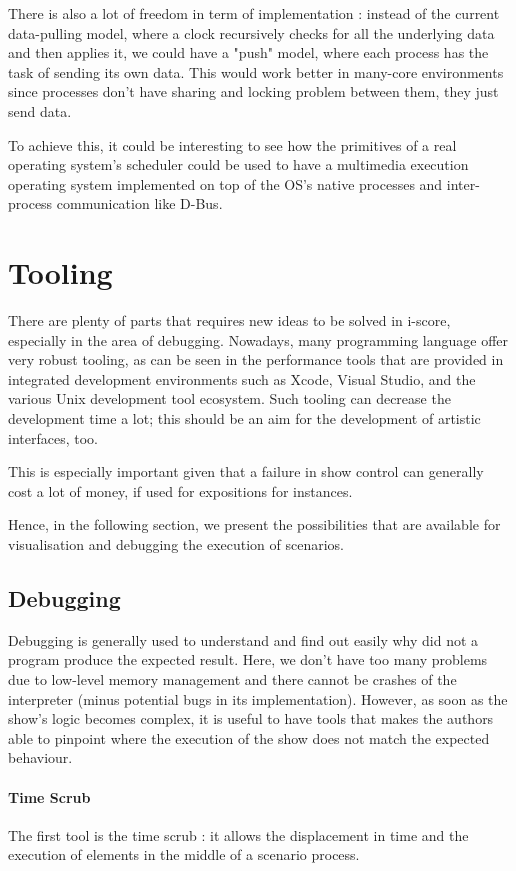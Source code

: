 \documentclass{sigchi}
\begin{document}
There is also a lot of freedom in term of implementation : instead of the current data-pulling model, where a clock recursively checks for all the underlying data and then applies it, we could have a "push" model, where each process has the task of sending its own data. This would work better in many-core environments since processes don't have sharing and locking problem between them, they just send data.

To achieve this, it could be interesting to see how the primitives of a real operating system's scheduler could be used to have a multimedia execution operating system implemented on top of the OS's native processes and inter-process communication like D-Bus.

\section{Tooling}
There are plenty of parts that requires new ideas to be solved in i-score, especially in the area of debugging. Nowadays, many programming language offer very robust tooling, as can be seen in the performance tools that are provided in integrated development environments such as Xcode, Visual Studio, and the various Unix development tool ecosystem\cite{spinellis2014software}. Such tooling can decrease the development time a lot; this should be an aim for the development of artistic interfaces, too.

This is especially important given that a failure in show control can generally cost a lot of money, if used for expositions for instances.

Hence, in the following section, we present the possibilities that are available for visualisation and debugging the execution of scenarios.


\subsection{Debugging}
Debugging is generally used to understand and find out easily why did not a program produce the expected result. Here, we don't have too many problems due to low-level memory management and there cannot be crashes of the interpreter (minus potential bugs in its implementation).  However, as soon as the show's logic becomes complex, it is useful to have tools that makes the authors able to pinpoint where the execution of the show does not match the expected behaviour.

\paragraph{Time Scrub}
The first tool is the time scrub : it allows the displacement in time and the execution of elements in the middle of a scenario process. 
\end{document}
